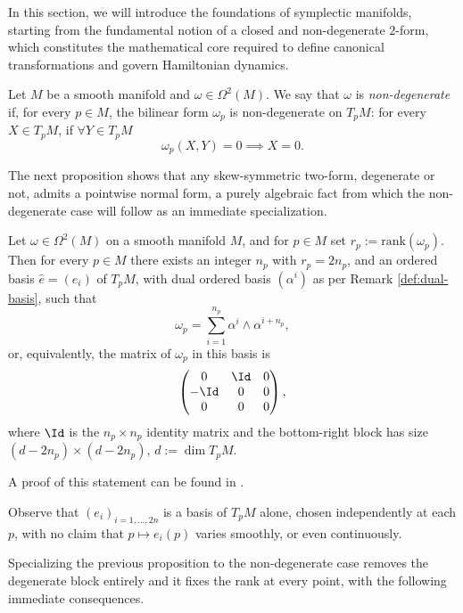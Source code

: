 In this section, we will introduce the foundations of symplectic manifolds, starting from the fundamental notion of a closed and non-degenerate $2$-form, which constitutes the mathematical core required to define canonical transformations and govern Hamiltonian dynamics.

\begin{definition}\label{def:non-deg}
	Let $M$ be a smooth manifold and $\omega \in \Omega^2(M)$. We say that $\omega$ is \emph{non-degenerate} if, for every $p \in M$, the bilinear form $\omega_p$ is non-degenerate on $T_pM$: for every $X \in T_pM$, if $\forall Y \in T_pM$ 
	\[
		\omega_p(X,Y) = 0 \implies X = 0.
	\]
\end{definition}

The next proposition shows that any skew-symmetric two-form, degenerate or not, admits a pointwise normal form, a purely algebraic fact from which the non-degenerate case will follow as an immediate specialization.

\begin{proposition}\label{prop:skew-normal-form-manifold}
	Let $\omega \in \Omega^2(M)$ on a smooth manifold $M$, and for $p \in M$ set $r_p := \mathrm{rank}(\omega_p)$. Then for every $p \in M$ there exists an integer $n_p$ with $r_p = 2n_p$, and an ordered basis $\hat e = (e_i)$ of $T_pM$, with dual ordered basis $(\alpha^i)$ as per Remark \ref{def:dual-basis}, such that
	\[
	\omega_p = \sum_{i=1}^{n_p} \alpha^i \wedge \alpha^{i+n_p},
	\]
	or, equivalently, the matrix of $\omega_p$ in this basis is
	\[
	\begin{pmatrix}
		0 & \Id & 0 \\
		-\Id & 0 & 0 \\
		0 & 0 & 0
	\end{pmatrix},
	\]
	where $\Id$ is the $n_p \times n_p$ identity matrix and the bottom-right block has size $(d-2n_p)\times(d-2n_p)$, $d := \dim T_pM$.
\end{proposition}

\noindent A proof of this statement can be found in \cite[Proposition 3.1.2]{abrahamFoundationsMechanics2008}.

\begin{remark}
	Observe that $(e_i)_{i=1,...,2n}$ is a basis of $T_pM$ alone, chosen independently at each $p$, with no claim that $p \mapsto e_i(p)$ varies smoothly, or even continuously.
\end{remark}

\noindent Specializing the previous proposition to the non-degenerate case removes the degenerate block entirely and it fixes the rank at every point, with the following immediate consequences.

